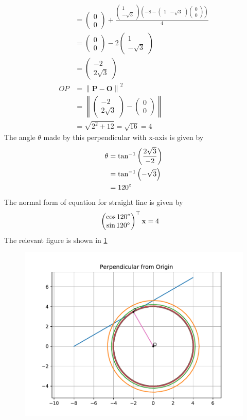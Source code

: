 \documentclass[12pt]{article}
\providecommand{\brak}[1]{\ensuremath{\left(#1\right)}}
\providecommand{\norm}[1]{\left\lVert#1\right\rVert}
\newcommand{\myvec}[1]{\ensuremath{\begin{pmatrix}#1\end{pmatrix}}}
\let\vec\mathbf
\begin{document}
\begin{enumerate}
\begin{align}
	&= \myvec{0 \\0}+ \frac{\myvec{1 \\ -\sqrt{3}}\brak{-8-\myvec{1 & -\sqrt{3}}\myvec{0 \\0}}}{4} \\
	&= \myvec{0 \\0}- 2\myvec{1 \\ -\sqrt{3}} \\
	&= \myvec{-2 \\ 2\sqrt{3}} \\
	OP &= \norm{\vec{P}-\vec{O}}^2 \\ 
	&= \norm{\myvec{-2 \\ 2\sqrt{3}}-\myvec{0 \\ 0}} \\
	&= \sqrt{2^2 + 12} = \sqrt{16} = 4
\end{align}	
The angle $\theta$ made by this perpendicular with x-axis is given by
\begin{align}
         \theta &= \tan^{-1}\brak{\frac{2\sqrt{3}}{-2}} \\
	 &= \tan^{-1}\brak{-\sqrt{3}} \\
	 &= 120\degree
\end{align}
The normal form of equation for straight line is given by
\begin{align}
	\myvec{\cos120\degree \\ \sin120\degree}^\top\vec{x} &= 4 
\end{align}
The relevant figure is shown in \ref{fig:Fig1}
\begin{figure}[!h]
	\begin{center}
		\includegraphics[width=\columnwidth]{figs/problem3.1.pdf}
	\end{center}
\caption{}
\label{fig:Fig1}
\end{figure}
\end{enumerate}
\end{document}
